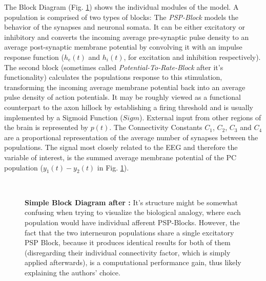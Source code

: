 The Block Diagram (Fig. \ref{fig:Jansen Rit Simple}) shows the individual modules of the model.
A population is comprised of two types of blocks:
The \textit{PSP-Block} models the behavior of the synapses and neuronal somata.
It can be either excitatory or inhibitory and converts the incoming average pre-synaptic pulse density to
an average post-synaptic membrane potential by convolving it with an impulse response function ($h_e(t)$ and $h_i(t)$,
for excitation and inhibition respectively).
The second block (sometimes called \textit{Potential-To-Rate-Block} after it's functionality)
calculates the populations response to this stimulation, transforming the incoming average membrane potential back into an average pulse density of action potentials. It may be roughly viewed as a functional counterpart to the axon hillock by establishing a firing threshold and is usually implemented by a Sigmoid Function ($Sigm$). External input from other regions of the brain is represented by $p(t)$. The Connectivity Constants $C_1$, $C_2$, $C_3$ and $C_4$ are a proportional representation of the average number of synapses between the populations. The signal most closely related to the EEG and therefore the variable of interest, is the summed average membrane potential of the PC population ($y_1(t)-y_2(t)$ in Fig. \ref{fig:Jansen Rit Simple}).

\\[1em]

\begin{figure}[H]
    \centering
    
    \caption{\textbf{Simple Block Diagram after \parencite{jansen_electroencephalogram_1995}:} It's structure might be somewhat confusing when trying to visualize the biological analogy, where each population would have individual afferent PSP-Blocks. However, the fact that the two interneuron populations share a single excitatory PSP Block, because it produces identical results for both of them (disregarding their individual connectivity factor, which is simply applied afterwards), is a computational performance gain, thus likely explaining the authors' choice.}
    \label{fig:Jansen Rit Simple}
\end{figure}


